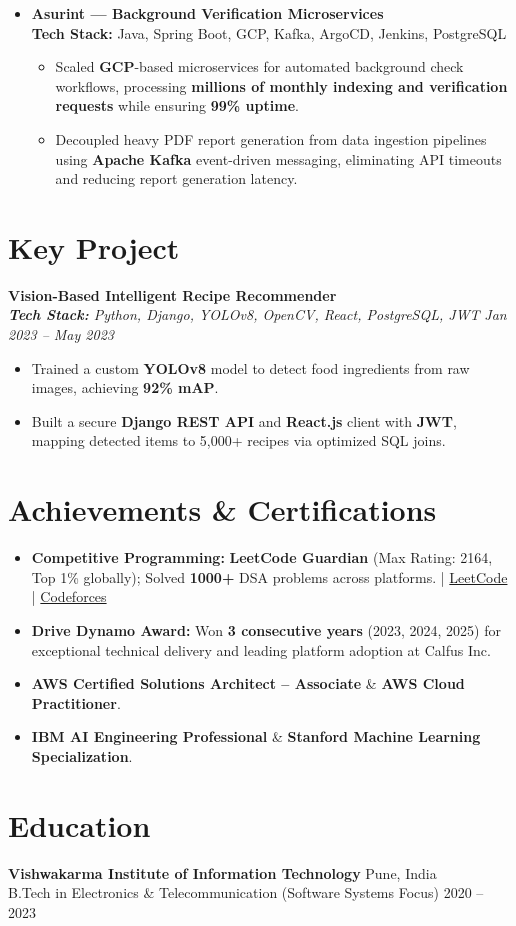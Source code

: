 \documentclass[10pt,a4paper]{article}
\begin{document}
\begin{itemize}
    \item \textbf{Asurint — Background Verification Microservices} \\
    {\small \textbf{Tech Stack:} Java, Spring Boot, GCP, Kafka, ArgoCD, Jenkins, PostgreSQL}
    \begin{itemize}[label=$\circ$]
        \item Scaled \textbf{GCP}-based microservices for automated background check workflows, processing \textbf{millions of monthly indexing and verification requests} while ensuring \textbf{99\% uptime}.
        \item Decoupled heavy PDF report generation from data ingestion pipelines using \textbf{Apache Kafka} event-driven messaging, eliminating API timeouts and reducing report generation latency.
    \end{itemize}
\end{itemize}

\section{Key Project}

\textbf{Vision-Based Intelligent Recipe Recommender} \\
\textit{\small \textbf{Tech Stack:} Python, Django, YOLOv8, OpenCV, React, PostgreSQL, JWT} \hfill \textit{Jan 2023 -- May 2023}
\begin{itemize}
    \item Trained a custom \textbf{YOLOv8} model to detect food ingredients from raw images, achieving \textbf{92\% mAP}.
    \item Built a secure \textbf{Django REST API} and \textbf{React.js} client with \textbf{JWT}, mapping detected items to 5,000+ recipes via optimized SQL joins.
\end{itemize}

\section{Achievements \& Certifications}
\begin{itemize}
    \item \textbf{Competitive Programming:} \textbf{LeetCode Guardian} (Max Rating: 2164, Top 1\% globally); Solved \textbf{1000+} DSA problems across platforms. | \href{https://leetcode.com/u/akunal/}{LeetCode} | \href{https://codeforces.com/profile/Kunalavghade}{Codeforces}
    \item \textbf{Drive Dynamo Award:} Won \textbf{3 consecutive years} (2023, 2024, 2025) for exceptional technical delivery and leading platform adoption at Calfus Inc.
    \item \textbf{AWS Certified Solutions Architect – Associate} \& \textbf{AWS Cloud Practitioner}.
    \item \textbf{IBM AI Engineering Professional} \& \textbf{Stanford Machine Learning Specialization}.
\end{itemize}

\section{Education}
\textbf{Vishwakarma Institute of Information Technology} \hfill Pune, India \\
B.Tech in Electronics \& Telecommunication (Software Systems Focus) \hfill 2020 -- 2023
\end{document}

